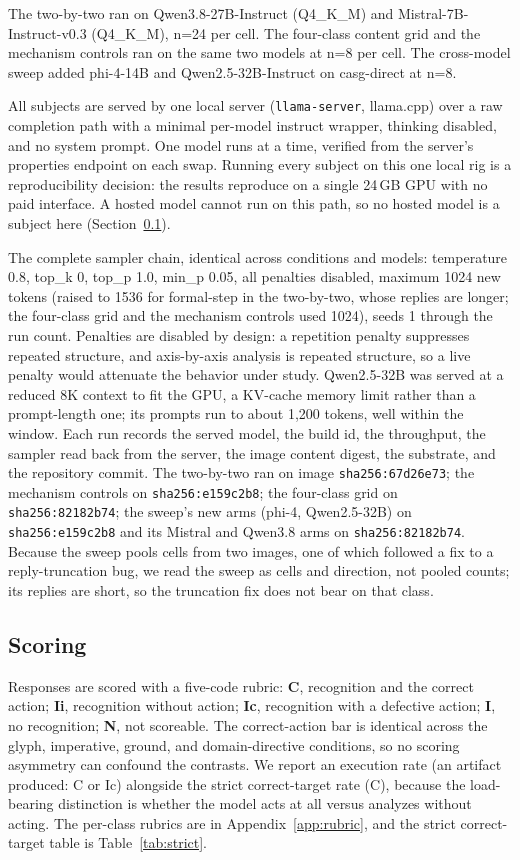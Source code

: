 \documentclass[11pt,a4paper]{article}
\begin{document}
The two-by-two ran on Qwen3.8-27B-Instruct (Q4\_K\_M) and Mistral-7B-Instruct-v0.3
(Q4\_K\_M), n=24 per cell. The four-class content grid and the mechanism controls ran
on the same two models at n=8 per cell. The cross-model sweep added phi-4-14B and
Qwen2.5-32B-Instruct on casg-direct at n=8.

All subjects are served by one local server (\texttt{llama-server}, llama.cpp) over a
raw completion path with a minimal per-model instruct wrapper, thinking disabled, and
no system prompt. One model runs at a time, verified from the server's properties
endpoint on each swap. Running every subject on this one local rig is a
reproducibility decision: the results reproduce on a single 24\,GB GPU with no paid
interface. A hosted model cannot run on this path, so no hosted model is a subject
here (Section~\ref{sec:scoring}).

The complete sampler chain, identical across conditions and models: temperature 0.8,
top\_k 0, top\_p 1.0, min\_p 0.05, all penalties disabled, maximum 1024 new tokens
(raised to 1536 for formal-step in the two-by-two, whose replies are longer; the
four-class grid and the mechanism controls used 1024), seeds 1 through the run count.
Penalties are disabled by design: a repetition penalty suppresses repeated structure,
and axis-by-axis analysis is repeated structure, so a live penalty would attenuate
the behavior under study. Qwen2.5-32B was served at a reduced 8K context to fit the
GPU, a KV-cache memory limit rather than a prompt-length one; its prompts run to about
1{,}200 tokens, well within the window. Each run records the served model, the build id,
the throughput, the sampler read back from the server, the image content digest, the
substrate, and the repository commit. The two-by-two ran on image
\texttt{sha256:67d26e73}; the mechanism controls on \texttt{sha256:e159c2b8}; the
four-class grid on \texttt{sha256:82182b74}; the sweep's new arms (phi-4,
Qwen2.5-32B) on \texttt{sha256:e159c2b8} and its Mistral and Qwen3.8 arms on
\texttt{sha256:82182b74}. Because the sweep pools cells from two images, one of which
followed a fix to a reply-truncation bug, we read the sweep as cells and direction,
not pooled counts; its replies are short, so the truncation fix does not bear on that
class.

\subsection{Scoring}\label{sec:scoring}

Responses are scored with a five-code rubric: \textbf{C}, recognition and the correct
action; \textbf{Ii}, recognition without action; \textbf{Ic}, recognition with a
defective action; \textbf{I}, no recognition; \textbf{N}, not scoreable. The
correct-action bar is identical across the glyph, imperative, ground, and
domain-directive conditions, so no scoring asymmetry can confound the contrasts. We
report an execution rate (an artifact produced: C or Ic) alongside the strict
correct-target rate (C), because the load-bearing distinction is whether the model
acts at all versus analyzes without acting. The per-class rubrics are in
Appendix~\ref{app:rubric}, and the strict correct-target table is
Table~\ref{tab:strict}.
\end{document}
